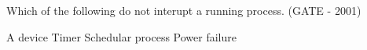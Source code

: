 
\begin{questyle}

  \question  Which of the following do not interupt a running process. (GATE - 2001)

  \begin{oneparchoices}
    \choice A device
    \choice Timer
    \choice Schedular process
    \choice Power failure
  \end{oneparchoices}

  \end{questyle}



